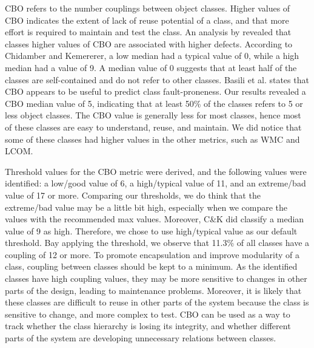 CBO refers to the number couplings between object classes. Higher values of CBO indicates the extent of lack of reuse potential of a class, and that more effort is required to maintain and test the class. An analysis by revealed that classes higher values of CBO are associated with higher defects\cite{subramanyam2003empirical}. According to Chidamber and Kemererer\cite{chidamber1994metrics}, a low median had a typical value of 0, while a high median had a value of 9. A median value of 0 suggests that at least half of the classes are self-contained and do not refer to other classes. Basili et al.\cite{basili1996validation} states that CBO appears to be useful to predict class fault-proneness. Our results revealed a CBO median value of 5, indicating that at least 50\% of the classes refers to 5 or less object classes. The CBO value is generally less for most classes, hence most of these classes are easy to understand, reuse, and maintain. We did notice that some of these classes had higher values in the other metrics, such as WMC and LCOM. 

Threshold values for the CBO metric were derived, and the following values were identified: a low/good value of 6, a high/typical value of 11, and an extreme/bad value of 17 or more. Comparing our thresholds, we do think that the extreme/bad value may be a little bit high, especially when we compare the values with the recommended max values. Moreover, C\&K did classify a median value of 9 as high. Therefore, we chose to use high/typical value as our default threshold. Bay applying the threshold, we observe that 11.3\% of all classes have a coupling of 12 or more. To promote encapsulation and improve modularity of a class, coupling between classes should be kept to a minimum. As the identified classes have high coupling values, they may be more sensitive to changes in other parts of the design, leading to maintenance problems. Moreover, it is likely that these classes are difficult to reuse in other parts of the system because the class is sensitive to change, and more complex to test. CBO can be used as a way to track whether the class hierarchy is losing its integrity, and whether different parts of the system are developing unnecessary relations between classes.


